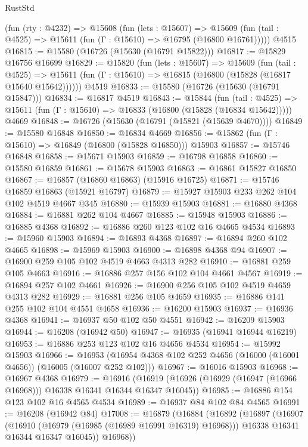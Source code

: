 \begin{lexlean}{RustStd}
\begin{coremodule}
    (fun (rty : @4232) =>
    @15608
      (fun (lets : @15607) =>
      @15609 (fun (tail : @4525) => @15611 (fun (Γ : @15610) => @16795 (@16800 @16761)))))
    @4515
@16815 := @15580 (@16726 (@15630 (@16791 @15822)))
@16817 := @15829 @16756 @16699
@16829 := @15820
    (fun (lets : @15607) =>
    @15609
      (fun (tail : @4525) =>
      @15611 (fun (Γ : @15610) => @16815 (@16800 (@15828 (@16817 @15640 @15642))))))
    @4519
@16833 := @15580 (@16726 (@15630 (@16791 @15847)))
@16834 := @16817 @4519
@16843 := @15844
    (fun (tail : @4525) => @15611 (fun (Γ : @15610) => @16833 (@16800 (@15828 (@16834 @15642)))))
    @4669
@16848 := @16726 (@15630 (@16791 (@15821 (@15639 @4670))))
@16849 := @15580 @16848
@16850 := @16834 @4669
@16856 := @15862 (fun (Γ : @15610) => @16849 (@16800 (@15828 @16850))) @15903
@16857 := @15746 @16848
@16858 := @15671 @15903
@16859 := @16798 @16858
@16860 := @15580 @16859
@16861 := @15678 @15903
@16863 := @16861 @15827 @16850
@16867 := @16857 (@16860 @16863) (@15916 @16725)
@16871 := @15746 @16859 @16863 (@15921 @16797)
@16879 := @15927 @15903 @233 @262 @104 @102 @4519 @4667 @345
@16880 := @15939 @15903
@16881 := @16880 @4368
@16884 := @16881 @262 @104 @4667
@16885 := @15948 @15903
@16886 := @16885 @4368
@16892 := @16886 @260 @123 @102 @16 @4665 @4534
@16893 := @15960 @15903
@16894 := @16893 @4368
@16897 := @16894 @260 @102 @4665
@16898 := @15969 @15903
@16900 := @16898 @4368 @94
@16907 := @16900 @259 @105 @102 @4519 @4663 @4313 @282
@16910 := @16881 @259 @105 @4663
@16916 := @16886 @257 @156 @102 @104 @4661 @4567
@16919 := @16894 @257 @102 @4661
@16926 := @16900 @256 @105 @102 @4519 @4659 @4313 @282
@16929 := @16881 @256 @105 @4659
@16935 := @16886 @141 @255 @102 @104 @4551 @4658
@16936 := @16200 @15903
@16937 := @16936 @4368
@16941 := @16937 @50 @102 @50 @4551
@16942 := @16209 @15903
@16944 := @16208 (@16942 @50)
@16947 := @16935 (@16941 @16944 @16219)
@16953 := @16886 @253 @123 @102 @16 @4656 @4534
@16954 := @15992 @15903
@16966 := @16953 (@16954 @4368 @102 @252 @4656 (@16000 (@16001 @4656)) (@16005 (@16007 @252 @102)))
@16967 := @16016 @15903
@16968 := @16967 @4368
@16979 := @16916
    (@16919 (@16926 (@16929 (@16947 (@16966 @16968))) @16338 @16341 @16344 @16347 @16045))
@16985 := @16886 @154 @123 @102 @16 @4565 @4534
@16989 := @16937 @84 @102 @84 @4565
@16991 := @16208 (@16942 @84)
@17008 := @16879
    (@16884
      (@16892
        (@16897
          (@16907
            (@16910 (@16979 (@16985 (@16989 @16991 @16319) @16968)))
            @16338
            @16341
            @16344
            @16347
            @16045))
        @16968))

\end{coremodule}
\end{lexlean}
